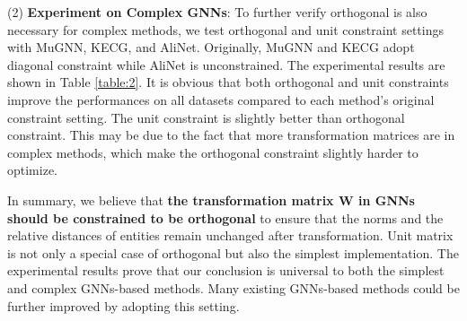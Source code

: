 \documentclass[sigconf,camera-ready]{acmart}
\begin{document}
\noindent
(2) \textbf{Experiment on Complex GNNs}:
To further verify orthogonal is also necessary for complex methods,
we test orthogonal and unit constraint settings with MuGNN, KECG, and AliNet.
Originally, MuGNN and KECG adopt diagonal constraint while AliNet is unconstrained.
The experimental results are shown in Table \ref{table:2}.
It is obvious that both orthogonal and unit constraints improve the performances on all datasets compared to each method's original constraint setting.
The unit constraint is slightly better than orthogonal constraint.
This may be due to the fact that more transformation matrices are in complex methods, which make the orthogonal constraint slightly harder to optimize.


In summary, we believe that \textbf{the transformation matrix $\bm{W}$ in GNNs should be constrained to be orthogonal} to ensure that the norms and the relative distances of entities remain unchanged after transformation.
Unit matrix is not only a special case of orthogonal but also the simplest implementation.
The experimental results prove that our conclusion is universal to both the simplest and complex GNNs-based methods.
Many existing GNNs-based methods could be further improved by adopting this setting.
\end{document}
